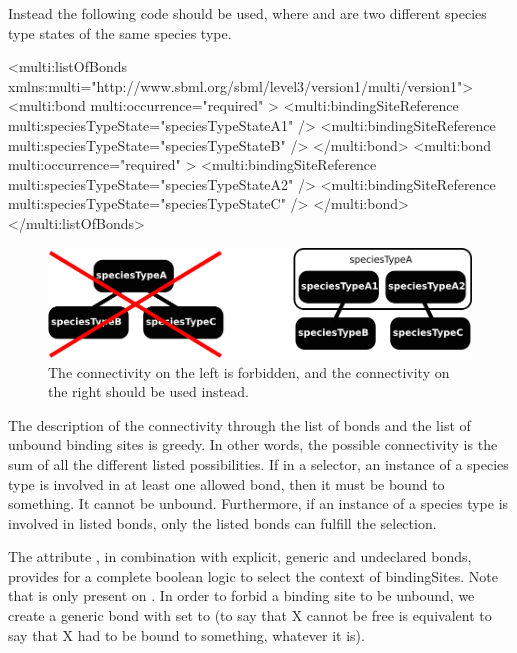 Instead the following code should be used, where  and  are two different species type states of the same species type.

\color{blue}
\begin{example}
<multi:listOfBonds xmlns:multi="http://www.sbml.org/sbml/level3/version1/multi/version1">
  <multi:bond multi:occurrence="required" >
    <multi:bindingSiteReference multi:speciesTypeState="speciesTypeStateA1" />
    <multi:bindingSiteReference multi:speciesTypeState="speciesTypeStateB" />
  </multi:bond>
  <multi:bond multi:occurrence="required" >
    <multi:bindingSiteReference multi:speciesTypeState="speciesTypeStateA2" />
    <multi:bindingSiteReference multi:speciesTypeState="speciesTypeStateC" />
  </multi:bond>
</multi:listOfBonds>
\end{example}
\normalcolor

\begin{figure}[H]
\begin{center}
\includegraphics[scale=0.7]{figs/pngs/ex_multipleBinding.png} 
\caption{The connectivity on the left is forbidden, and the connectivity on the right should be used instead.}
\label{fig:ex_multipleBinding}
\end{center}
\end{figure}

The description of the connectivity through the list of bonds and the list of unbound binding sites is greedy. In other words, the possible connectivity is the sum of all the different listed possibilities. If in a selector, an instance of a species type is involved in at least one allowed bond, then it must be bound to something. It cannot be unbound. Furthermore, if an instance of a species type is involved in listed bonds, only the listed bonds can fulfill the selection. 

The attribute , in combination with explicit, generic and undeclared bonds, provides for a complete boolean logic to select the context of bindingSites. Note that  is only present on . In order to forbid a binding site to be unbound, we create a generic bond with  set to  (to say that X cannot be free is equivalent to say that X had to be bound to something, whatever it is).

